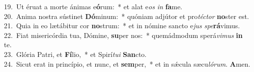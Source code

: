 {19.~}Ut éruat a morte ánimas e\textbf{ó}rum:~* et alat e\textit{os} \textit{in} \textbf{fa}me.\\
{20.~}Anima nostra sústinet \textbf{Dó}minum:~* quóniam adjútor et pro\textit{té}\textit{ctor} \textbf{no}ster est.\\
{21.~}Quia in eo lætábitur cor \textbf{no}strum:~* et in nómine sancto e\textit{jus} \textit{spe}\textbf{rá}vimus.\\
{22.~}Fiat misericórdia tua, Dómine, \textbf{su}per nos:~* quemádmodum sperá\textit{vi}\textit{mus} \textbf{in} te.\\
{23.~}Glória Patri, et \textbf{Fí}lio,~* et Spirí\textit{tu}\textit{i} \textbf{San}cto.\\
{24.~}Sicut erat in princípio, et nunc, et \textbf{sem}per,~* et in sǽcula sæcu\textit{ló}\textit{rum}. \textbf{A}men.\\
